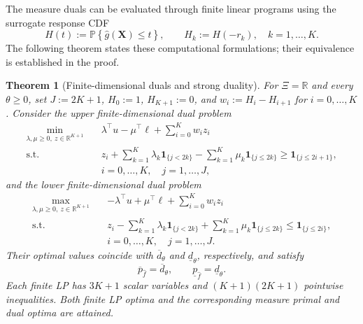 \documentclass[review,11pt,3p,authoryear,nopreprintline]{elsarticle}
\newtheorem{theorem}{Theorem}
\begin{document}
The measure duals can be evaluated through finite linear programs using the surrogate response CDF
\begin{equation}
  H(t):=\mathbb P\left\{\hat g(\bm X)\le t\right\},\qquad
  H_k:=H(-r_k),\quad k=1,\ldots,K.
  \label{eq-surrogate-response-cdf}
\end{equation}
The following theorem states these computational formulations; their equivalence is established in the proof.

\begin{theorem}[Finite-dimensional duals and strong duality]
  \label{thm-finite-dual-reformulations}
  For $\Xi=\mathbb R$ and every $\theta\ge0$, set $J:=2K+1$, $H_0:=1$, $H_{K+1}:=0$, and $w_i:=H_i-H_{i+1}$ for $i=0,\ldots,K$. Consider the upper finite-dimensional dual problem
  \begin{equation}
    \begin{aligned}
      \min_{\lambda,\mu\ge0,\ z\in\mathbb R^{K+1}}\quad&
      \lambda^\top u-\mu^\top\ell+\sum_{i=0}^K w_i z_i\\
      \text{s.t.}\quad&
      z_i+\sum_{k=1}^K\lambda_k\mathbf1_{\{j<2k\}}
      -\sum_{k=1}^K\mu_k\mathbf1_{\{j\le2k\}}
      \ge\mathbf1_{\{j\le2i+1\}},\\
      &i=0,\ldots,K,\quad j=1,\ldots,J,
    \end{aligned}
    \label{eq-finite-upper-dual}
  \end{equation}
  and the lower finite-dimensional dual problem
  \begin{equation}
    \begin{aligned}
      \max_{\lambda,\mu\ge0,\ z\in\mathbb R^{K+1}}\quad&
      -\lambda^\top u+\mu^\top\ell+\sum_{i=0}^K w_i z_i\\
      \text{s.t.}\quad&
      z_i-\sum_{k=1}^K\lambda_k\mathbf1_{\{j<2k\}}
      +\sum_{k=1}^K\mu_k\mathbf1_{\{j\le2k\}}
      \le\mathbf1_{\{j\le2i\}},\\
      &i=0,\ldots,K,\quad j=1,\ldots,J.
    \end{aligned}
    \label{eq-finite-lower-dual}
  \end{equation}
  Their optimal values coincide with $\overline d_\theta$ and $\underline d_\theta$, respectively, and satisfy
  \begin{equation}
    \overline p_{\hat f}=\overline d_\theta,\qquad
    \underline p_{\hat f}=\underline d_\theta.
    \label{eq-strong-duality}
  \end{equation}
  Each finite LP has $3K+1$ scalar variables and $(K+1)(2K+1)$ pointwise inequalities. Both finite LP optima and the corresponding measure primal and dual optima are attained.
\end{theorem}
\end{document}
